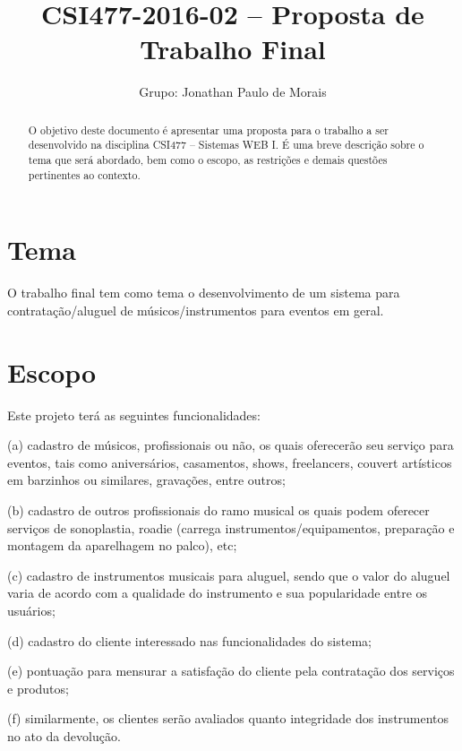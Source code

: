 \documentclass[10pt,a4paper,article]{abntex2}
\author{Grupo: Jonathan Paulo de Morais}
\title{CSI477-2016-02 -- Proposta de Trabalho Final}
\begin{document}
	\maketitle

	\begin{abstract}
		O objetivo deste documento é apresentar uma proposta para o trabalho a ser desenvolvido na disciplina CSI477 -- Sistemas WEB I. É uma breve descrição sobre o tema que será abordado, bem como o escopo, as restrições e demais questões pertinentes ao contexto.
	\end{abstract}		
	
	\section{Tema}
	
		O trabalho final tem como tema o desenvolvimento de um sistema para contratação/aluguel de músicos/instrumentos para eventos em geral.
	
	\section{Escopo}
	
		Este projeto terá as seguintes funcionalidades: 
		
		(a) cadastro de músicos, profissionais ou não, os quais oferecerão seu serviço para eventos, tais como aniversários, casamentos, shows, freelancers, couvert artísticos em barzinhos ou similares, gravações, entre outros;

		(b) cadastro de outros profissionais do ramo musical os quais podem oferecer serviços de sonoplastia, roadie (carrega instrumentos/equipamentos, preparação e montagem da aparelhagem no palco), etc;

		(c) cadastro de instrumentos musicais para aluguel, sendo que o valor do aluguel varia de acordo com a qualidade do instrumento e sua popularidade entre os usuários;

		(d) cadastro do cliente interessado nas funcionalidades do sistema;
		
		(e) pontuação para mensurar a satisfação do cliente pela contratação dos serviços e produtos;

		(f) similarmente, os clientes serão avaliados quanto integridade dos instrumentos no ato da devolução.

\end{document}
